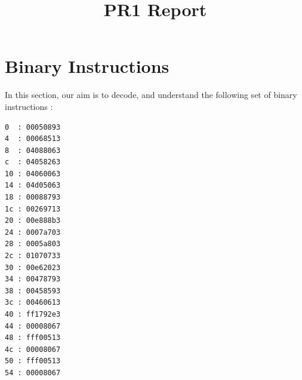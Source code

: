 \documentclass[a4paper,12pt]{article}
\title{PR1 Report}
\begin{document}

\newpage
\thispagestyle{empty} 
\tableofcontents

\newpage
\thispagestyle{empty} 


\newpage
\setcounter{page}{1}

\date{}
\maketitle

\section{Binary Instructions}
In this section, our aim is to decode, and understand the following set of binary instructions :

\begin{verbatim}
0  : 00050893
4  : 00068513
8  : 04088063
c  : 04058263
10 : 04060063
14 : 04d05063
18 : 00088793
1c : 00269713
20 : 00e888b3
24 : 0007a703
28 : 0005a803
2c : 01070733
30 : 00e62023
34 : 00478793
38 : 00458593
3c : 00460613
40 : ff1792e3
44 : 00008067
48 : fff00513
4c : 00008067
50 : fff00513
54 : 00008067
\end{verbatim}%
\end{document}
